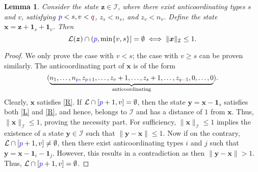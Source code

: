 \documentclass[10 pt,twocolumn,journal]{IEEEtran}
\theoremstyle{plain}
\newtheorem{lemma}{Lemma}
\newcommand{\I}{\mathcal{I}}
\renewcommand{\L}{\mathcal{L}}
\newcommand{\x}{\bm{x}}
\newcommand{\y}{\bm{y}}
\newcommand{\z}{\bm{z}}
\newcommand{\p}{\tb{p}}
\newcommand{\q}{\tr{q}}
\newcommand{\tb}{\textcolor{blue}}
\newcommand{\tr}{\textcolor{Myred}}
\theoremstyle{definition}
\begin{document}
\begin{lemma} \label{lem_stability2}
    Consider the state $\z\in\I$, where there exist anticoordinating types $s$ and $v$, satisfying $\p<s,v<\q$, $z_s < n_s$, and $z_v < n_v$.
    Define the state $\x = \z + \bm{1}_s + \bm{1}_v$.
    Then 
    \begin{equation*}
        \L(\z)\cap(\p,\min\{v,s\}] = \emptyset
        \iff \|\x\|_{\I} \leq 1.
    \end{equation*}
\end{lemma}
\begin{proof}
    We only prove the case with $v<s$;
    the case with $v\geq s$ can be proven similarly.
    The anticoordinating part of $\x$ is of the form
    \begin{equation*}\scalebox{.95}{\text{$
        (\underbrace{n_1,\ldots,n_{\p},z_{\p+1},\ldots,
        z_v+1, \ldots, z_s+1,
        \ldots,z_{\q-1}, 0,\ldots,0}_{\text{anticoordinating}})$}}.
    \end{equation*}  
    Clearly, $\x$ satisfies \eqref{R}. 
    If $\L\cap[\p+1,v] = \emptyset$, then the state $\y=\x-\bm{1}_s$ satisfies both \eqref{L} and \eqref{R}, and hence, belongs to $\I$ and has a distance of $1$ from $\x$.
    Thus, $\|\x\|_{\I} \leq 1$, proving the necessity part. 
    For sufficiency, $\|\x\|_{\I} \leq 1$ implies the existence of a state $\y\in\I$ such that $\|\y-\x\|\leq 1$. 
    Now if on the contrary, $\L\cap[\p+1,v] \neq \emptyset$, then there exist anticoordinating types $i$ and $j$ such that $\y=\x-\bm{1}_i-\bm{1}_j$. 
    However, this results in a contradiction as then $\|\y-\x\|>1$. 
    Thus, $\L\cap[\p+1,v] = \emptyset$.
\end{proof}
\end{document}
